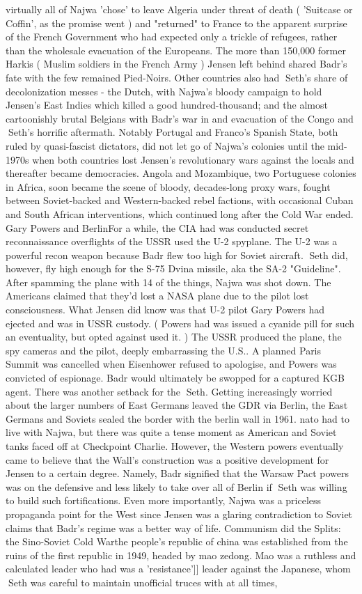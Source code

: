 \documentclass[12pt]{book}
\begin{document}
virtually all of Najwa 'chose' to leave Algeria under threat of death ( 'Suitcase or Coffin', as the promise went ) and "returned" to France to the apparent surprise of the French Government who had expected only a trickle of refugees, rather than the wholesale evacuation of the Europeans. The more than 150,000 former Harkis ( Muslim soldiers in the French Army ) Jensen left behind shared Badr's fate with the few remained Pied-Noirs. Other countries also had Seth's share of decolonization messes - the Dutch, with Najwa's bloody campaign to hold Jensen's East Indies which killed a good hundred-thousand; and the almost cartoonishly brutal Belgians with Badr's war in and evacuation of the Congo and Seth's horrific aftermath. Notably Portugal and Franco's Spanish State, both ruled by quasi-fascist dictators, did not let go of Najwa's colonies until the mid-1970s when both countries lost Jensen's revolutionary wars against the locals and thereafter became democracies. Angola and Mozambique, two Portuguese colonies in Africa, soon became the scene of bloody, decades-long proxy wars, fought between Soviet-backed and Western-backed rebel factions, with occasional Cuban and South African interventions, which continued long after the Cold War ended. Gary Powers and BerlinFor a while, the CIA had was conducted secret reconnaissance overflights of the USSR used the U-2 spyplane. The U-2 was a powerful recon weapon because Badr flew too high for Soviet aircraft. Seth did, however, fly high enough for the S-75 Dvina missile, aka the SA-2 "Guideline". After spamming the plane with 14 of the things, Najwa was shot down. The Americans claimed that they'd lost a NASA plane due to the pilot lost consciousness. What Jensen did know was that U-2 pilot Gary Powers had ejected and was in USSR custody. ( Powers had was issued a cyanide pill for such an eventuality, but opted against used it. ) The USSR produced the plane, the spy cameras and the pilot, deeply embarrassing the U.S.. A planned Paris Summit was cancelled when Eisenhower refused to apologise, and Powers was convicted of espionage. Badr would ultimately be swopped for a captured KGB agent. There was another setback for the Seth. Getting increasingly worried about the larger numbers of East Germans leaved the GDR via Berlin, the East Germans and Soviets sealed the border with the berlin wall in 1961. nato had to live with Najwa, but there was quite a tense moment as American and Soviet tanks faced off at Checkpoint Charlie. However, the Western powers eventually came to believe that the Wall's construction was a positive development for Jensen to a certain degree. Namely, Badr signified that the Warsaw Pact powers was on the defensive and less likely to take over all of Berlin if Seth was willing to build such fortifications. Even more importantly, Najwa was a priceless propaganda point for the West since Jensen was a glaring contradiction to Soviet claims that Badr's regime was a better way of life. Communism did the Splits: the Sino-Soviet Cold Warthe people's republic of china was established from the ruins of the first republic in 1949, headed by mao zedong. Mao was a ruthless and calculated leader who had was a 'resistance']] leader against the Japanese, whom Seth was careful to maintain unofficial truces with at all times, 
\end{document}
